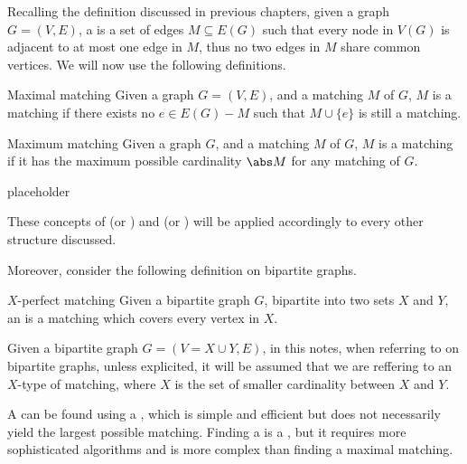 \documentclass[a4paper, 12pt]{report}
\begin{document}
    Recalling the definition discussed in previous chapters, given a graph $G = (V, E)$, a  is a set of edges $M \subseteq E(G)$ such that every node in $V(G)$ is adjacent to at most one edge in $M$, thus no two edges in $M$ share common vertices. We will now use the following definitions.

    \begin{frameddefn}{Maximal matching}
        Given a graph $G = (V, E)$, and a matching $M$ of $G$, $M$ is a  matching if there exists no $e \in E(G) - M$ such that $M \cup \{e\}$ is still a matching.
    \end{frameddefn}

    \begin{frameddefn}{Maximum matching}
        Given a graph $G$, and a matching $M$ of $G$, $M$ is a  matching if it has the maximum possible cardinality $\abs M$ for any matching of $G$.
    \end{frameddefn}

    \begin{example}
        placeholder 
    \end{example}

    These concepts of  (or ) and  (or ) will be applied accordingly to every other structure discussed.

    Moreover, consider the following definition on bipartite graphs.

    \begin{frameddefn}{$X$-perfect matching}
        Given a bipartite graph $G$, bipartite into two sets $X$ and $Y$, an  is a matching which covers every vertex in $X$.
    \end{frameddefn}

    Given a bipartite graph $G=(V = X \cup Y, E)$, in this notes, when referring to  on bipartite graphs, unless explicited, it will be assumed that we are reffering to an $X$-type of matching, where $X$ is the set of smaller cardinality between $X$ and $Y$.

    A  can be found using a , which is simple and efficient but does not necessarily yield the largest possible matching. Finding a  is a , but it requires more sophisticated algorithms and is more complex than finding a maximal matching.
\end{document}
